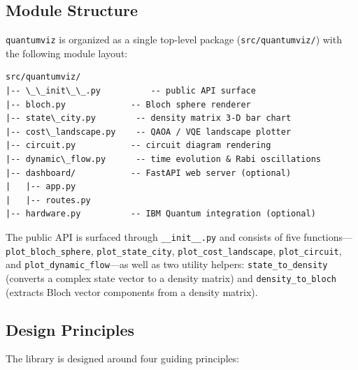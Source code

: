 \documentclass{SciPost}
\begin{document}
\subsection{Module Structure}

\texttt{quantumviz} is organized as a single top-level package
(\texttt{src/quantumviz/}) with the following module layout:

\begin{lstlisting}
src/quantumviz/ 
|-- \_\_init\_\_.py          -- public API surface
|-- bloch.py             -- Bloch sphere renderer
|-- state\_city.py        -- density matrix 3-D bar chart
|-- cost\_landscape.py    -- QAOA / VQE landscape plotter
|-- circuit.py           -- circuit diagram rendering
|-- dynamic\_flow.py      -- time evolution & Rabi oscillations
|-- dashboard/           -- FastAPI web server (optional)
|   |-- app.py
|   |-- routes.py
|-- hardware.py          -- IBM Quantum integration (optional)
\end{lstlisting}

The public API is surfaced through \texttt{\_\_init\_\_.py} and consists of
five functions---\texttt{plot\_bloch\_sphere}, \texttt{plot\_state\_city},
\texttt{plot\_cost\_landscape}, \texttt{plot\_circuit}, and
\texttt{plot\_dynamic\_flow}---as well as two utility helpers:
\texttt{state\_to\_density} (converts a complex state vector to a density
matrix) and \texttt{density\_to\_bloch} (extracts Bloch vector components
from a density matrix).

\subsection{Design Principles}

The library is designed around four guiding principles:
\end{document}
